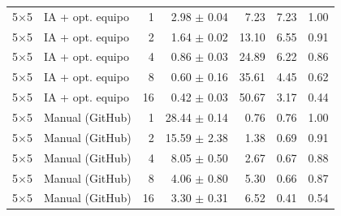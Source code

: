 \begin{tabular}{llrrrrr}
5$\times$5 & IA + opt. equipo & 1 & 2.98 $\pm$ 0.04 & 7.23 & 7.23 & 1.00 \\
5$\times$5 & IA + opt. equipo & 2 & 1.64 $\pm$ 0.02 & 13.10 & 6.55 & 0.91 \\
5$\times$5 & IA + opt. equipo & 4 & 0.86 $\pm$ 0.03 & 24.89 & 6.22 & 0.86 \\
5$\times$5 & IA + opt. equipo & 8 & 0.60 $\pm$ 0.16 & 35.61 & 4.45 & 0.62 \\
5$\times$5 & IA + opt. equipo & 16 & 0.42 $\pm$ 0.03 & 50.67 & 3.17 & 0.44 \\
5$\times$5 & Manual (GitHub) & 1 & 28.44 $\pm$ 0.14 & 0.76 & 0.76 & 1.00 \\
5$\times$5 & Manual (GitHub) & 2 & 15.59 $\pm$ 2.38 & 1.38 & 0.69 & 0.91 \\
5$\times$5 & Manual (GitHub) & 4 & 8.05 $\pm$ 0.50 & 2.67 & 0.67 & 0.88 \\
5$\times$5 & Manual (GitHub) & 8 & 4.06 $\pm$ 0.80 & 5.30 & 0.66 & 0.87 \\
5$\times$5 & Manual (GitHub) & 16 & 3.30 $\pm$ 0.31 & 6.52 & 0.41 & 0.54 \\
\bottomrule
\end{tabular}
